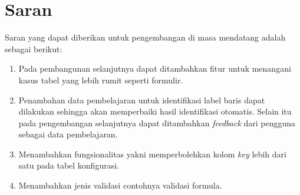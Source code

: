 \section{Saran}
Saran yang dapat diberikan untuk pengembangan di masa mendatang adalah sebagai berikut:
\begin{enumerate}
	\item Pada pembangunan selanjutnya dapat ditambahkan fitur untuk menangani kasus tabel yang lebih rumit seperti formulir.
	\item Penambahan data pembelajaran untuk identifikasi label baris dapat dilakukan sehingga akan memperbaiki hasil identifikasi otomatis. Selain itu pada pengembangan selanjutnya dapat ditambahkan \textit{feedback} dari pengguna sebagai data pembelajaran.
	\item Menambahkan fungsionalitas yakni memperbolehkan kolom \textit{key} lebih dari satu pada tabel konfigurasi.
	\item Menambahkan jenis validasi contohnya validasi formula.
\end{enumerate}